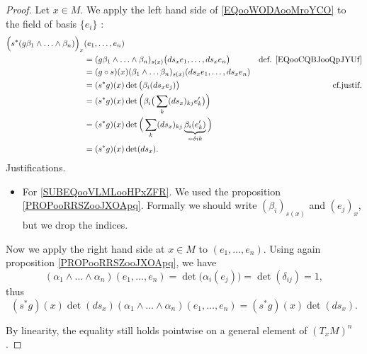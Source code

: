 	\begin{proof}
	Let \( x\in M\). We apply the left hand side of \eqref{EQooWODAooMroYCO} to the field of basis \( \{ e_i \}\) :
		\begin{subequations}
		\begin{align}
		\Big( s^*(g\beta_1\wedge \ldots \wedge\beta_n) \Big)_x & (e_1,\ldots,e_n)                                                       \nonumber                                                     \\
			& =(g\beta_1\wedge \ldots\wedge \beta_n)_{s(x)}\big( ds_xe_1,\ldots,ds_xe_n \big)       & \text{def. \eqref{EQooCQBJooQpJYUf}}         \\
			& = (g\circ s)(x)(\beta_1\wedge\ldots \beta_n)_{s(x)}(ds_xe_1,\ldots,ds_xe_n)                                                          \\
			& = (s^*g)(x)\det\big( \beta_i(ds_xe_j) \big)                                           & \text{cf.justif.}		\label{SUBEQooVLMLooHPxZFR} \\
			& = (s^*g)(x)\det\Big( \beta_i\big( \sum_k(ds_x)_{kj}e'_k \big) \Big)                                                                  \\
			& = (s^*g)(x)\det\Big(  \sum_k(ds_x)_{kj}\underbrace{\beta_i(e'_k)}_{=\delta{ik}} \Big)                                                \\
			& = (s^*g)(x)\det(ds_x).
			\end{align}
			\end{subequations}
			Justifications.
			\begin{itemize}
			\item
			For \eqref{SUBEQooVLMLooHPxZFR}. We used the proposition \ref{PROPooRRSZooJXOApq}. Formally we should write \( (\beta_i)_{s(x)}\) and \( (e_j)_x\), but we drop the indices.
			\end{itemize}
			Now we apply the right hand side at \( x\in M\) to \( (e_1,\ldots,e_n)\). Using again proposition \ref{PROPooRRSZooJXOApq}, we have
			\begin{equation}
			(\alpha_1\wedge\ldots\wedge \alpha_n)(e_1,\ldots,e_n)=\det\big( \alpha_i(e_j) \big)=\det(\delta_{ij})=1,
			\end{equation}
			thus
			\begin{equation}
			(s^*g)(x)\det(ds_x)(\alpha_1\wedge\ldots\wedge \alpha_n)(e_1,\ldots,e_n)=(s^*g)(x)\det(ds_x).
			\end{equation}

			By linearity, the equality still holds pointwise on a general element of \(  (T_xM)^n\).
			\end{proof}


